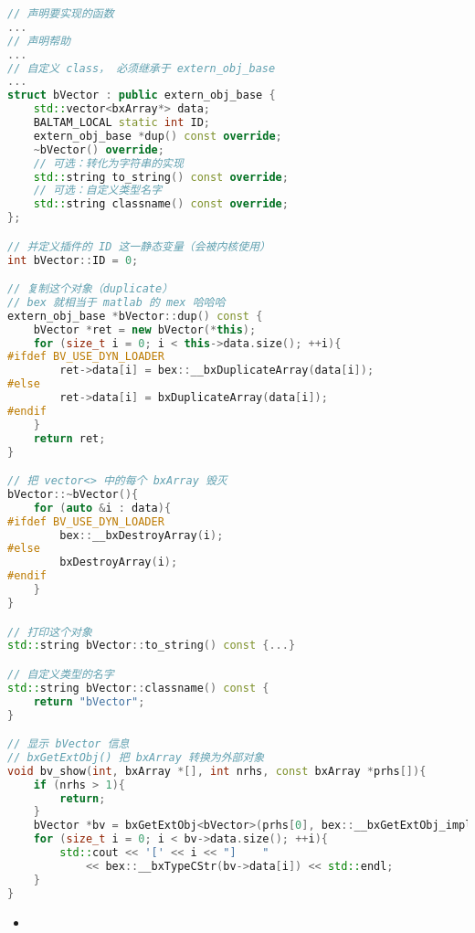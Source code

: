 \begin{lstlisting}[language=cpp,caption=vector 插件的 main.cpp]
// 声明要实现的函数
...
// 声明帮助
...
// 自定义 class， 必须继承于 extern_obj_base
...
struct bVector : public extern_obj_base {
    std::vector<bxArray*> data;
    BALTAM_LOCAL static int ID;
    extern_obj_base *dup() const override;
    ~bVector() override;
    // 可选：转化为字符串的实现
    std::string to_string() const override;
    // 可选：自定义类型名字
    std::string classname() const override;
};

// 并定义插件的 ID 这一静态变量（会被内核使用）
int bVector::ID = 0;

// 复制这个对象（duplicate）
// bex 就相当于 matlab 的 mex 哈哈哈
extern_obj_base *bVector::dup() const {
    bVector *ret = new bVector(*this);
    for (size_t i = 0; i < this->data.size(); ++i){
#ifdef BV_USE_DYN_LOADER
        ret->data[i] = bex::__bxDuplicateArray(data[i]);
#else
        ret->data[i] = bxDuplicateArray(data[i]);
#endif
    }
    return ret;
}

// 把 vector<> 中的每个 bxArray 毁灭
bVector::~bVector(){
    for (auto &i : data){
#ifdef BV_USE_DYN_LOADER
        bex::__bxDestroyArray(i);
#else
        bxDestroyArray(i);
#endif
    }
}

// 打印这个对象
std::string bVector::to_string() const {...}

// 自定义类型的名字
std::string bVector::classname() const {
    return "bVector";
}

// 显示 bVector 信息
// bxGetExtObj() 把 bxArray 转换为外部对象
void bv_show(int, bxArray *[], int nrhs, const bxArray *prhs[]){
    if (nrhs > 1){
        return;
    }
    bVector *bv = bxGetExtObj<bVector>(prhs[0], bex::__bxGetExtObj_impl);
    for (size_t i = 0; i < bv->data.size(); ++i){
        std::cout << '[' << i << "]    "
            << bex::__bxTypeCStr(bv->data[i]) << std::endl;
    }
}
\end{lstlisting}

\begin{itemize}
\item 
\end{itemize}

